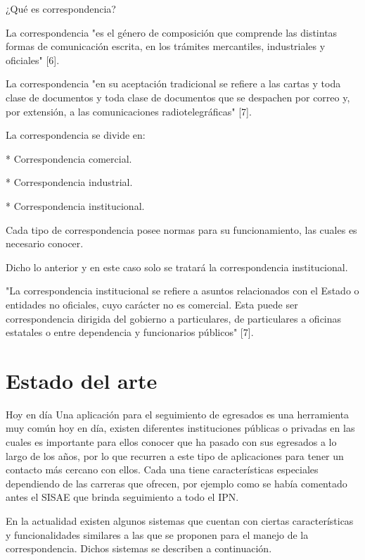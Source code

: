 ¿Qué es correspondencia?

La correspondencia "es el género de composición que comprende las distintas formas de comunicación escrita, en los trámites mercantiles, industriales y oficiales" [6].

La correspondencia "en su aceptación tradicional se refiere a las cartas y toda clase de documentos y toda clase de documentos que se despachen por correo y, por extensión, a las comunicaciones radiotelegráficas" [7].

La correspondencia se divide en:

* Correspondencia comercial.

* Correspondencia industrial.

* Correspondencia institucional.

Cada tipo de correspondencia posee normas para su funcionamiento, las cuales es necesario conocer.

Dicho lo anterior y en este caso solo se tratará la correspondencia institucional.

"La correspondencia institucional se refiere a asuntos relacionados con el Estado o entidades no oficiales, cuyo carácter no es comercial. Esta puede ser correspondencia dirigida del gobierno a particulares, de particulares a oficinas estatales o entre dependencia y funcionarios públicos" [7].

\section{Estado del arte}

Hoy en día 
Una aplicación para el seguimiento de egresados es una herramienta muy común hoy en día, existen diferentes instituciones públicas o privadas en las cuales es importante para ellos conocer que ha pasado con sus egresados a lo largo de los años, por lo que recurren a este tipo de aplicaciones para tener un contacto más cercano con ellos. Cada una tiene características especiales dependiendo de las carreras que ofrecen, por ejemplo como se había comentado antes el SISAE que brinda seguimiento a todo el IPN.

En la actualidad existen algunos sistemas que cuentan con ciertas características y funcionalidades similares a las que se proponen para el manejo de la correspondencia. Dichos sistemas se describen a continuación.